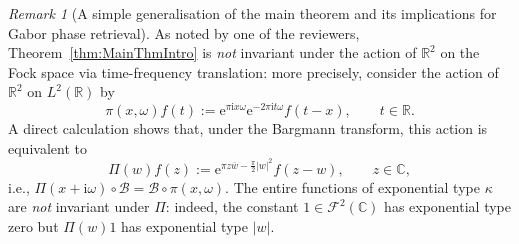 \documentclass{article}
\theoremstyle{remark}
\newtheorem{remark}{Remark}
\begin{document}
    \begin{remark}[A simple generalisation of the main theorem and its implications for Gabor phase retrieval]\label{rem:review3}
        As noted by one of the reviewers, Theorem~\ref{thm:MainThmIntro} is \emph{not} invariant under the action of $\mathbb R^2$ on the Fock space via time-frequency translation: more precisely, consider the action of $\mathbb R^2$ on $L^2(\mathbb R)$ by
        \begin{equation*}
            \pi(x,\omega) f(t) := \mathrm e^{\pi \mathrm i x \omega} \mathrm e^{-2 \pi \mathrm i t \omega} f(t-x), \qquad t \in \mathbb R.
        \end{equation*}
        A direct calculation shows that, under the Bargmann transform, this action is equivalent to 
        \begin{equation*}
            \Pi(w) f(z) := \mathrm e^{\pi z \overline w - \frac{\pi}{2} \lvert w \rvert^2} f(z-w), \qquad z \in \mathbb C,
        \end{equation*}
        i.e., $\Pi(x + \mathrm i \omega) \circ \mathcal B = \mathcal B \circ \pi(x,\omega)$. The entire functions of exponential type $\kappa$ are \emph{not} invariant under $\Pi$: indeed, the constant $1 \in \mathcal F^2(\mathbb C)$ has exponential type zero but $\Pi(w) 1$ has exponential type $\lvert w \rvert$.
        

\end{remark}
\end{document}
